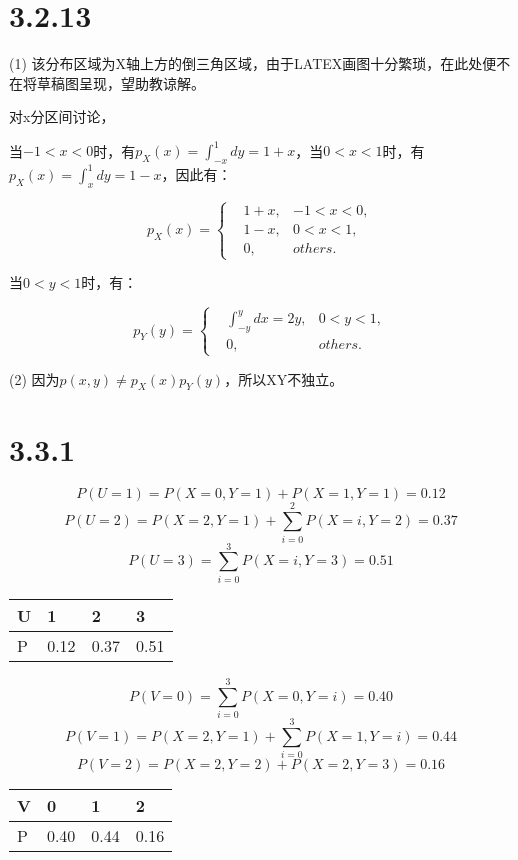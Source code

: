 \documentclass{article}
\begin{document}
\section{3.2.13}
(1)
该分布区域为X轴上方的倒三角区域，由于LATEX画图十分繁琐，在此处便不在将草稿图呈现，望助教谅解。

对x分区间讨论，

当$-1<x<0$时，有$p_X(x)=\int^1_{-x}dy=1+x$，当$0<x<1$时，有$p_X(x)=\int^1_{x}dy=1-x$，因此有：

\begin{equation}
p_X(x)=\left\{
\begin{aligned}
&1+x,&-1<x<0,\\
&1-x,&0<x<1,\\
&0,&others.
\end{aligned}
\right.
\end{equation}

当$0<y<1$时，有：

\begin{equation}
p_Y(y)=\left\{
\begin{aligned}
&\int^{y}_{-y}dx=2y,&0<y<1,\\
&0,&others.
\end{aligned}
\right.
\end{equation}

(2)
因为$p(x,y)\neq p_X(x)p_Y(y) $，所以XY不独立。

\section{3.3.1}
$$P(U=1)=P(X=0,Y=1)+P(X=1,Y=1)=0.12$$
$$P(U=2)=P(X=2,Y=1)+\sum^2_{i=0}P(X=i,Y=2)=0.37$$
$$P(U=3)=\sum^3_{i=0}P(X=i,Y=3)=0.51$$
\begin{table}[H]
\centering
\begin{tabular}{|l|l|l|l|}
\hline
U & 1    & 2    & 3    \\ \hline
P & 0.12 & 0.37 & 0.51 \\ \hline
\end{tabular}
\end{table}

$$P(V=0)=\sum^3_{i=0}P(X=0,Y=i)=0.40$$
$$P(V=1)=P(X=2,Y=1)+\sum^3_{i=0}P(X=1,Y=i)=0.44$$
$$P(V=2)=P(X=2,Y=2)+P(X=2,Y=3)=0.16$$


\begin{table}[H]
\centering
\begin{tabular}{|l|l|l|l|}
\hline
V & 0    & 1    & 2    \\ \hline
P & 0.40 & 0.44 & 0.16 \\ \hline
\end{tabular}
\end{table}
\end{document}
